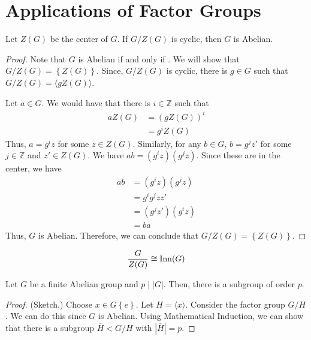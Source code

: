 \section{Applications of Factor Groups}

\begin{theorem}
    Let \(Z(G)\) be the center of \(G\). If \(G / Z(G)\) is cyclic, then \(G\) is Abelian.
\end{theorem}

\begin{proof}
    Note that \(G\) is Abelian if and only if . We will show that \(G / Z(G) = \left\{Z(G)\right\}\). Since, \(G / Z(G)\) is cyclic, there is \(g \in G\) such that \(G / Z(G) = \langle gZ(G) \rangle\).

    Let \(a \in G\). We would have that there is \(i \in \mathbb{Z}\) such that
\[
\begin{aligned}
    aZ(G) &= (gZ(G))^i \\
          &= g^iZ(G)
\end{aligned}
\]
Thus, \(a = g^iz\) for some \(z \in Z(G)\). Similarly, for any \(b \in G\), \(b = g^jz'\) for some \(j \in \mathbb{Z}\) and \(z' \in Z(G)\). We have \(ab = (g^iz)(g^jz)\). Since these are in the center, we have
\[
\begin{aligned}
    ab &= (g^iz)(g^jz) \\
       &= g^ig^jzz' \\
       &= (g^jz')(g^iz) \\
       &= ba
\end{aligned}
\]
Thus, \(G\) is Abelian. Therefore, we can conclude that \(G/Z(G) = \left\{Z(G)\right\}\).
\end{proof}

\begin{theorem}
    \[
        \frac{G}{Z(G)} \cong \operatorname{Inn}(G)
    \]
\end{theorem}

\begin{theorem}
     Let \(G\) be a finite Abelian group and \(p \mid |G|\). Then, there is a subgroup of order \(p\).
\end{theorem}

\begin{proof}
    (Sketch.) Choose \(x \in G \left\{e\right\}\). Let \(H = \langle x \rangle\). Consider the factor group \(G/H\). We can do this since \(G\) is Abelian. Using Mathematical Induction, we can show that there is a subgroup \(\overline{H} < G/H\) with \(|\overline{H}| = p\).
\end{proof}

